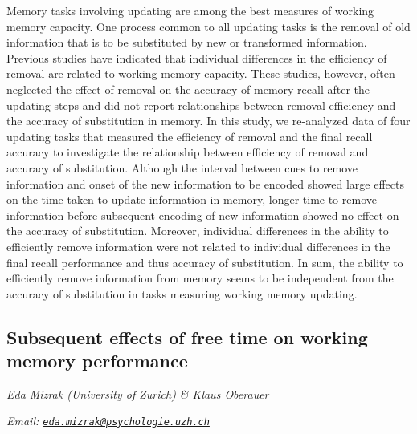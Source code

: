 \documentclass[
  12pt,
]{book}
\begin{document}
Memory tasks involving updating are among the best measures of working memory capacity. One process common to all updating tasks is the removal of old information that is to be substituted by new or transformed information. Previous studies have indicated that individual differences in the efficiency of removal are related to working memory capacity. These studies, however, often neglected the effect of removal on the accuracy of memory recall after the updating steps and did not report relationships between removal efficiency and the accuracy of substitution in memory. In this study, we re-analyzed data of four updating tasks that measured the efficiency of removal and the final recall accuracy to investigate the relationship between efficiency of removal and accuracy of substitution. Although the interval between cues to remove information and onset of the new information to be encoded showed large effects on the time taken to update information in memory, longer time to remove information before subsequent encoding of new information showed no effect on the accuracy of substitution. Moreover, individual differences in the ability to efficiently remove information were not related to individual differences in the final recall performance and thus accuracy of substitution. In sum, the ability to efficiently remove information from memory seems to be independent from the accuracy of substitution in tasks measuring working memory updating.

\hypertarget{subsequent-effects-of-free-time-on-working-memory-performance}{%
\subsection{Subsequent effects of free time on working memory performance}\label{subsequent-effects-of-free-time-on-working-memory-performance}}

\emph{Eda Mizrak (University of Zurich) \& Klaus Oberauer}

\emph{Email: \href{mailto:eda.mizrak@psychologie.uzh.ch}{\nolinkurl{eda.mizrak@psychologie.uzh.ch}}}
\end{document}
